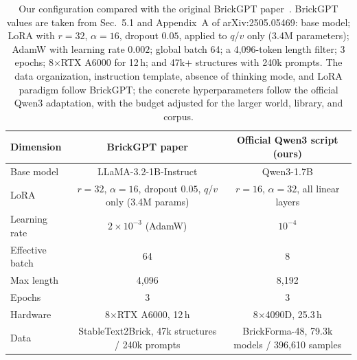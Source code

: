\begin{table}[!htbp]
\centering
\small
\setlength{\tabcolsep}{5pt}
\begin{tabular}{lcc}
\toprule
Dimension & BrickGPT paper & Official Qwen3 script (ours) \\
\midrule
Base model & LLaMA-3.2-1B-Instruct & Qwen3-1.7B \\
LoRA & $r=32$, $\alpha=16$, dropout $0.05$, $q$/$v$ only (3.4M params) & $r=16$, $\alpha=32$, all linear layers \\
Learning rate & $2{\times}10^{-3}$ (AdamW) & $10^{-4}$ \\
Effective batch & 64 & 8 \\
Max length & 4,096 & 8,192 \\
Epochs & 3 & 3 \\
Hardware & 8$\times$RTX A6000, 12\,h & 8$\times$4090D, 25.3\,h \\
Data & StableText2Brick, 47k structures / 240k prompts & BrickForma-48, 79.3k models / 396,610 samples \\
\bottomrule
\end{tabular}
\caption{Our configuration compared with the original BrickGPT paper~\cite{brickgpt}. BrickGPT values are taken from Sec.~5.1 and Appendix~A of arXiv:2505.05469: base model; LoRA with $r{=}32$, $\alpha{=}16$, dropout $0.05$, applied to $q$/$v$ only (3.4M parameters); AdamW with learning rate $0.002$; global batch 64; a 4,096-token length filter; 3 epochs; 8$\times$RTX A6000 for 12\,h; and 47k+ structures with 240k prompts. The data organization, instruction template, absence of thinking mode, and LoRA paradigm follow BrickGPT; the concrete hyperparameters follow the official Qwen3 adaptation, with the budget adjusted for the larger world, library, and corpus.}
\label{tab:brickgpt-recipe}
\end{table}

